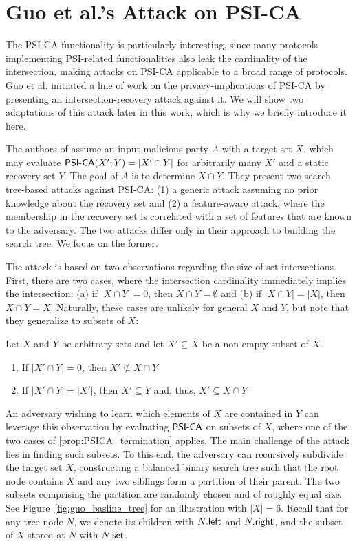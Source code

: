 \section{Guo et al.'s Attack on PSI-CA}\label{ap:guo_attack}
The PSI-CA functionality is particularly interesting, since many protocols implementing PSI-related functionalities
also leak the cardinality of the intersection, making attacks on PSI-CA applicable to a broad range of protocols.   
Guo et al. \cite{USENIX:GHLWJL22} initiated a line of work on the privacy-implications of PSI-CA
by presenting an intersection-recovery attack against it.
We will show two adaptations of this attack later in this work, 
which is why we briefly introduce it here.

The authors of \cite{USENIX:GHLWJL22} assume an input-malicious party $A$ with a
target set $X$, which may evaluate $\mathsf{PSI\mbox{-}CA}(X'; Y) = |X' \cap Y|$ for arbitrarily
many $X'$ and a static recovery set $Y$.  The goal of $A$ is to determine
$X \cap Y$.  They present two search tree-based attacks against PSI-CA: (1) a
generic attack assuming no prior knowledge about the recovery set and (2) a
feature-aware attack, where the membership in the recovery set is correlated
with a set of features that are known to the adversary.  The two attacks differ
only in their approach to building the search tree.  We focus on the former.

The attack is based on two observations regarding the size of set intersections.
First, there are two cases, where the intersection cardinality immediately
implies the intersection:
(a) if $|X \cap Y| = 0$, then $X \cap Y = \emptyset$ and (b) if $|X \cap Y| = |X|$, then $X \cap Y = X$.
Naturally, these cases are unlikely for general $X$ and $Y$, but note that they generalize to subsets of $X$:
\begin{proposition}\label{prop:PSICA_termination}
  Let $X$ and $Y$ be arbitrary sets and let $X' \subseteq X$ be a non-empty subset of $X$. 
  \begin{enumerate}
  \item[(a)] If $|X' \cap Y| = 0$, then $X' \not\subseteq X \cap Y$
  \item[(b)] If $|X' \cap Y| = |X'|$, then $X' \subseteq Y$ and, thus, $X' \subseteq X \cap Y$
  \end{enumerate}	
\end{proposition} 

An adversary wishing to learn which elements of $X$ are contained in $Y$ can leverage this observation
by evaluating $\mathsf{PSI\mbox{-}CA}$ on subsets of $X$, where one of the two cases of \ref{prop:PSICA_termination} applies.
The main challenge of the attack lies in finding such subsets.
To this end, the adversary can recursively subdivide the target set $X$, constructing a balanced binary search tree
such that the root node contains $X$ and any two siblings form a partition of their parent.
The two subsets comprising the partition are randomly chosen and of roughly equal size.
See Figure~\ref{fig:guo_basline_tree} for an illustration with $|X| = 6$.
Recall that for any tree node $N$, we denote its children with $N.\mathsf{left}$ and $N.\mathsf{right}$,
and the subset of $X$ stored at $N$ with $N.\mathsf{set}$.

